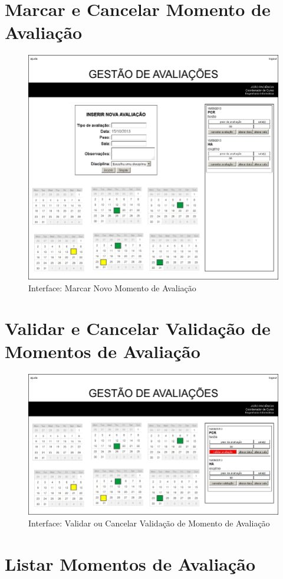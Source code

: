 \section{Marcar e Cancelar Momento de Avaliação}

\begin{figure}[!htbp]
\centering
\includegraphics{imagens/nova_avaliacao_i.jpg}
\caption{Interface: Marcar Novo Momento de Avaliação}
\label{fig:nova_avaliacao_i}
\end{figure}


\clearpage
\section{Validar e Cancelar Validação de Momentos de Avaliação}

\begin{figure}[!htbp]
\centering
\includegraphics{imagens/validar_avaliacao_i.jpg}
\caption{Interface: Validar ou Cancelar Validação de Momento de Avaliação}
\label{fig:validar_avaliacao_i}
\end{figure}


\clearpage
\section{Listar Momentos de Avaliação}